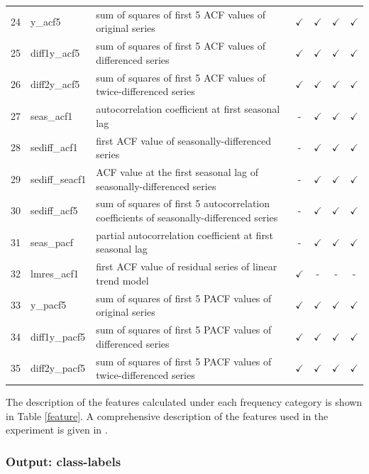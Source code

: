 \documentclass[11pt,a4paper,]{article}
\def\yes{$\checkmark$}
\theoremstyle{definition}
\theoremstyle{definition}
\theoremstyle{definition}
\theoremstyle{remark}
\begin{document}
\begin{table}[!htp]
\begin{tabular}{llp{}cccc}
24 & y\_acf5        & sum of squares of first 5 ACF values of original series                                 & \yes  & \yes & \yes & \yes\\
25 & diff1y\_acf5   & sum of squares of first 5 ACF values of differenced series                              & \yes  & \yes & \yes & \yes\\
26 & diff2y\_acf5   & sum of squares of first 5 ACF values of twice-differenced series                        & \yes  & \yes & \yes & \yes \\
27 & seas\_acf1     & autocorrelation coefficient at first seasonal lag                                       & -     & \yes & \yes & \yes\\
28 & sediff\_acf1   & first ACF value of seasonally-differenced series                                        & -     & \yes & \yes & \yes\\
29 & sediff\_seacf1 & ACF value at the first seasonal lag of seasonally-differenced series                    & -     & \yes & \yes & \yes\\
30 & sediff\_acf5   & sum of squares of first 5 autocorrelation coefficients of seasonally-differenced series & -     & \yes & \yes & \yes\\
31 & seas\_pacf     & partial autocorrelation coefficient at first seasonal lag & -     & \yes & \yes & \yes\\
32 & lmres\_acf1    & first ACF value of residual series of linear trend model                                & \yes  & - & - & -\\
33 & y\_pacf5       & sum of squares of first 5 PACF values of original series                                & \yes  & \yes & \yes & \yes\\
34 & diff1y\_pacf5  & sum of squares of first 5 PACF values of differenced series                             & \yes  & \yes & \yes & \yes\\
35 & diff2y\_pacf5  & sum of squares of first 5 PACF values of twice-differenced series                       & \yes  & \yes & \yes & \yes\\
\bottomrule
 \end{tabular}
\end{table}

The description of the features calculated under each frequency category
is shown in Table \ref{feature}. A comprehensive description of the
features used in the experiment is given in \textcite{fforms}.

\subsubsection{Output: class-labels}\label{output-class-labels}
\end{document}
